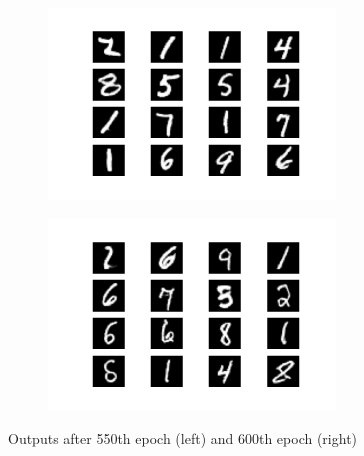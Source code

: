 \documentclass{article}
\begin{document}
\begin{appendices}
\begin{figure}[H]
\centering
\begin{subfigure}{.5\textwidth}
  \centering
  \includegraphics[width=3in]{csci-8110/hw-4/images/generated_plot_e550.png}
  \label{fig:ep20}
\end{subfigure}%
\begin{subfigure}{.5\textwidth}
  \centering
  \includegraphics[width=3in]{csci-8110/hw-4/images/generated_plot_e600.png}
  \label{fig:ep100_2}
\end{subfigure}
\caption{Outputs after 550th epoch (left) and 600th epoch (right)}
\label{fig:ep20-100}
\end{figure}

\end{appendices}
\end{document}
